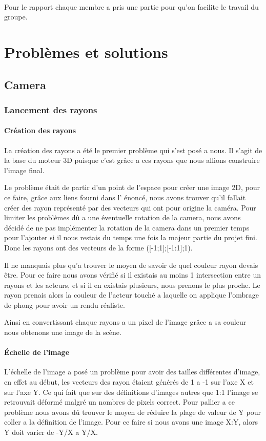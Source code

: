 \documentclass[12pt]{article}
\begin{document}
		\paragraph{}Pour le rapport chaque membre a pris une partie pour qu'on facilite le travail du groupe.
	\newpage
	
	\section{Problèmes et solutions}
		\subsection{Camera}
			\subsubsection{Lancement des rayons}
				\paragraph{Création des rayons}
				La création des rayons a été le premier problème qui s'est posé a nous. Il s'agit de la base du moteur 3D puisque c'est grâce a ces rayons que nous allions construire l'image final.
				
				Le problème était de partir d'un point de l'espace pour créer une image 2D, pour ce faire, grâce aux liens fourni dans l' énoncé, nous avons trouver qu'il fallait créer des rayon représenté par des vecteurs qui ont pour origine la caméra. Pour limiter les problèmes dû a une éventuelle rotation de la camera, nous avons décidé de ne pas implémenter la rotation de la camera dans un premier temps pour l'ajouter si il nous restais du temps une fois la majeur partie du projet fini. Donc les rayons ont des vecteurs de la forme ([-1;1];[-1:1];1).
				
				Il ne manquais plus qu'a trouver le moyen de savoir de quel couleur rayon devais être. Pour ce faire nous avons vérifié si il existais au moins 1 intersection entre un rayons et les acteurs, et si il en existais plusieurs, nous prenons le plus proche. Le rayon prenais alors la couleur de l'acteur touché a laquelle on applique l'ombrage de phong pour avoir un rendu réaliste.
				
				Ainsi en convertissant chaque rayons a un pixel de l'image grâce a sa couleur nous obtenons une image de la scène. 
				\paragraph{Échelle de l'image}
				L'échelle de l'image a posé un problème pour avoir des tailles différentes d'image, en effet au début, les vecteurs des rayon étaient générés de 1 a -1 sur l'axe X et sur l'axe Y. Ce qui fait que sur des définitions d'images autres que 1:1 l'image se retrouvait déformé malgré un nombres de pixels correct. Pour pallier a ce problème nous avons dû trouver le moyen de réduire la plage de valeur de Y pour coller a la définition de l'image. Pour ce faire si nous avons une image X:Y, alors Y doit varier de -Y/X a Y/X.
				
\end{document}
